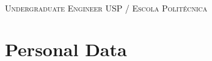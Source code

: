 \documentclass[a4paper,10pt]{article}
\begin{document}
\pagestyle{empty} %

\par{ \\ \normalsize \textsc{Undergraduate Engineer USP / Escola Politécnica}
\medskip\par} %

\section{Personal Data}

\vspace*{5pt}
\hspace*{0pt}

\end{document}
